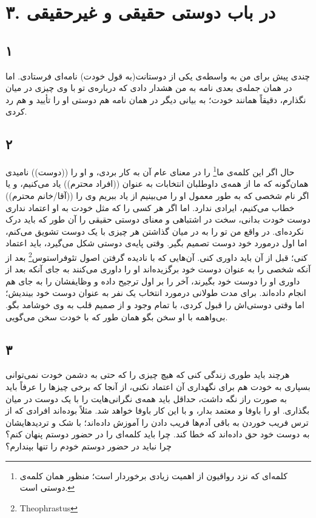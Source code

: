 \documentclass{article}
\author{github.com/parasilius/moral-letters-to-lucilius}
\begin{document}
\section*{۳. در باب دوستی حقیقی و غیرحقیقی}
    \subsection*{۱}
    چندی پیش برای من به واسطه‌ی یکی از دوستانت(به قول خودت) نامه‌ای فرستادی.
    اما در همان جمله‌ی بعدی نامه به من هشدار دادی که درباره‌ی تو با وی چیزی در میان نگذارم، دقیقاً همانند خودت؛
    به بیانی دیگر در همان نامه هم دوستی او را تأیید و هم رد کردی.
    \subsection*{۲}
    حال اگر این کلمه‌ی ما\footnote{کلمه‌ای که نزد رواقیون از اهمیت زیادی برخوردار است؛ منظور همان کلمه‌ی دوستی است.} را در معنای عام آن به کار بردی، و او را ((دوست)) نامیدی همان‌گونه که ما از همه‌ی داوطلبان انتخابات به عنوان ((افراد محترم)) یاد می‌کنیم، و یا اگر نام شخصی که به طور معمول او را می‌بینیم از یاد ببریم وی را ((آقا/خانم محترم)) خطاب می‌‌کنیم، ایرادی ندارد.
    اما اگر هر کسی را که مثل خودت به او اعتماد نداری دوست خودت بدانی، سخت در اشتباهی و معنای دوستی حقیقی را آن طور که باید درک نکرده‌ای.
    در واقع من تو را به در میان گذاشتن هر چیزی با یک دوست تشویق می‌کنم، اما اول درمورد خود دوست تصمیم بگیر.
    وقتی پایه‌ی دوستی شکل می‌گیرد، باید اعتماد کنی؛ قبل از آن باید داوری کنی.
    آن‌هایی که با نادیده گرفتن اصول تئوفراستوس\footnote{Theophrastus} بعد از آنکه شخصی را به عنوان دوست خود برگزیده‌اند او را داوری می‌کنند به جای آنکه بعد از داوری او را دوست خود بگیرند، آخر را بر اول ترجیح داده و وظایفشان را به جای هم انجام داده‌اند.
    برای مدت طولانی درمورد انتخاب یک نفر به عنوان دوست خود بیندیش؛ اما وقتی دوستی‌اش را قبول کردی، با تمام وجود و از صمیم قلب به وی خوشامد بگو.
    بی‌واهمه با او سخن بگو همان طور که با خودت سخن می‌گویی.
    \subsection*{۳}
    هرچند باید طوری زندگی کنی که هیچ چیزی را که حتی به دشمن خودت نمی‌توانی بسپاری به خودت هم برای نگهداری آن اعتماد نکنی، از آنجا که برخی چیزها را عرفاً باید به صورت راز نگه داشت، حداقل باید همه‌ی نگرانی‌هایت را با یک دوست در میان بگذاری.
    او را باوفا و معتمد بدار، و با این کار باوفا خواهد شد.
    مثلاً بوده‌اند افرادی که از ترس فریب خوردن به باقی آدم‌ها فریب دادن را آموزش داده‌اند؛
    با شک و تردیدهایشان به دوست خود حق داده‌اند که خطا کند.
    چرا باید کلمه‌ای را در حضور دوستم پنهان کنم؟
    چرا نباید در حضور دوستم خودم را تنها بپندارم؟
\end{document}
